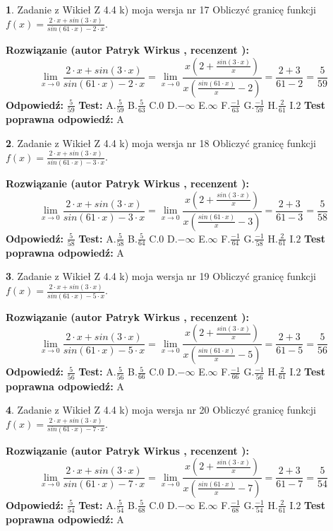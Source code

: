 \documentclass[12pt, a4paper]{article}
\theoremstyle{definition} %
\newtheorem{zad}{}
\newcommand{\zadStart}[1]{\begin{zad}#1\newline}
\newcommand{\zadStop}{\end{zad}}
\newcommand{\rozwStart}[2]{\noindent \textbf{Rozwiązanie (autor #1 , recenzent #2): }\newline}
\newcommand{\rozwStop}{\newline}
\newcommand{\odpStart}{\noindent \textbf{Odpowiedź:}\newline}
\newcommand{\odpStop}{\newline}
\newcommand{\testStart}{\noindent \textbf{Test:}\newline}
\newcommand{\testStop}{\newline}
\newcommand{\kluczStart}{\noindent \textbf{Test poprawna odpowiedź:}\newline}
\newcommand{\kluczStop}{\newline}
\begin{document}
\zadStart{Zadanie z Wikieł Z 4.4 k) moja wersja nr 17}
Obliczyć granicę funkcji $f(x)=\frac{2\cdot x +sin(3\cdot x)}{sin(61\cdot x) -2\cdot x}$.
\zadStop
\rozwStart{Patryk Wirkus}{}
$$\lim\limits_{x\to 0}\frac{2\cdot x +sin(3\cdot x)}{sin(61\cdot x) -2\cdot x}
=\lim\limits_{x\to 0}\frac{x(2+\frac{sin(3\cdot x)}{x})}{x(\frac{sin(61\cdot x)}{x}-2)}
=\frac{2+3}{61-2} = \frac{5}{59}$$
\rozwStop
\odpStart
$\frac{5}{59}$
\odpStop
\testStart
A.$\frac{5}{59}$
B.$\frac{5}{63}$
C.$0$
D.$-\infty$
E.$\infty$
F.$\frac{-1}{63}$
G.$\frac{-1}{59}$
H.$\frac{2}{61}$
I.$2$
\testStop
\kluczStart
A
\kluczStop



\zadStart{Zadanie z Wikieł Z 4.4 k) moja wersja nr 18}
Obliczyć granicę funkcji $f(x)=\frac{2\cdot x +sin(3\cdot x)}{sin(61\cdot x) -3\cdot x}$.
\zadStop
\rozwStart{Patryk Wirkus}{}
$$\lim\limits_{x\to 0}\frac{2\cdot x +sin(3\cdot x)}{sin(61\cdot x) -3\cdot x}
=\lim\limits_{x\to 0}\frac{x(2+\frac{sin(3\cdot x)}{x})}{x(\frac{sin(61\cdot x)}{x}-3)}
=\frac{2+3}{61-3} = \frac{5}{58}$$
\rozwStop
\odpStart
$\frac{5}{58}$
\odpStop
\testStart
A.$\frac{5}{58}$
B.$\frac{5}{64}$
C.$0$
D.$-\infty$
E.$\infty$
F.$\frac{-1}{64}$
G.$\frac{-1}{58}$
H.$\frac{2}{61}$
I.$2$
\testStop
\kluczStart
A
\kluczStop



\zadStart{Zadanie z Wikieł Z 4.4 k) moja wersja nr 19}
Obliczyć granicę funkcji $f(x)=\frac{2\cdot x +sin(3\cdot x)}{sin(61\cdot x) -5\cdot x}$.
\zadStop
\rozwStart{Patryk Wirkus}{}
$$\lim\limits_{x\to 0}\frac{2\cdot x +sin(3\cdot x)}{sin(61\cdot x) -5\cdot x}
=\lim\limits_{x\to 0}\frac{x(2+\frac{sin(3\cdot x)}{x})}{x(\frac{sin(61\cdot x)}{x}-5)}
=\frac{2+3}{61-5} = \frac{5}{56}$$
\rozwStop
\odpStart
$\frac{5}{56}$
\odpStop
\testStart
A.$\frac{5}{56}$
B.$\frac{5}{66}$
C.$0$
D.$-\infty$
E.$\infty$
F.$\frac{-1}{66}$
G.$\frac{-1}{56}$
H.$\frac{2}{61}$
I.$2$
\testStop
\kluczStart
A
\kluczStop



\zadStart{Zadanie z Wikieł Z 4.4 k) moja wersja nr 20}
Obliczyć granicę funkcji $f(x)=\frac{2\cdot x +sin(3\cdot x)}{sin(61\cdot x) -7\cdot x}$.
\zadStop
\rozwStart{Patryk Wirkus}{}
$$\lim\limits_{x\to 0}\frac{2\cdot x +sin(3\cdot x)}{sin(61\cdot x) -7\cdot x}
=\lim\limits_{x\to 0}\frac{x(2+\frac{sin(3\cdot x)}{x})}{x(\frac{sin(61\cdot x)}{x}-7)}
=\frac{2+3}{61-7} = \frac{5}{54}$$
\rozwStop
\odpStart
$\frac{5}{54}$
\odpStop
\testStart
A.$\frac{5}{54}$
B.$\frac{5}{68}$
C.$0$
D.$-\infty$
E.$\infty$
F.$\frac{-1}{68}$
G.$\frac{-1}{54}$
H.$\frac{2}{61}$
I.$2$
\testStop
\kluczStart
A
\kluczStop
\end{document}
